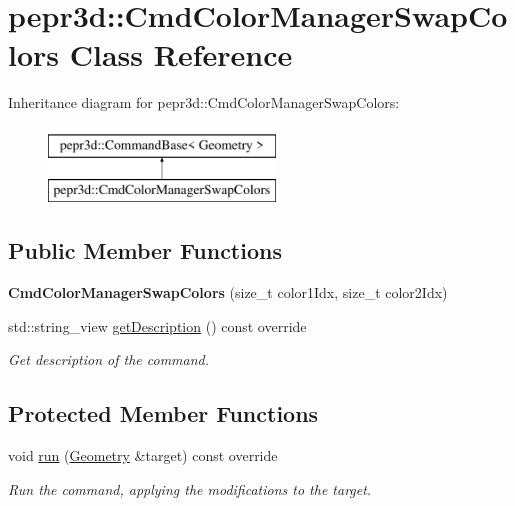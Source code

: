\hypertarget{classpepr3d_1_1_cmd_color_manager_swap_colors}{}\section{pepr3d\+::Cmd\+Color\+Manager\+Swap\+Colors Class Reference}
\label{classpepr3d_1_1_cmd_color_manager_swap_colors}
Inheritance diagram for pepr3d\+::Cmd\+Color\+Manager\+Swap\+Colors\+:\begin{figure}[H]
\begin{center}
\leavevmode
\includegraphics[height=2.000000cm]{classpepr3d_1_1_cmd_color_manager_swap_colors}
\end{center}
\end{figure}
\subsection*{Public Member Functions}
\begin{DoxyCompactItemize}
\item 
\mbox{\label{classpepr3d_1_1_cmd_color_manager_swap_colors_af6dc11ce3593fe744de4227aedc03239}} 
{\bfseries Cmd\+Color\+Manager\+Swap\+Colors} (size\+\_\+t color1\+Idx, size\+\_\+t color2\+Idx)
\item 
\mbox{\label{classpepr3d_1_1_cmd_color_manager_swap_colors_abec8b759af2a20f032491ec55a6e36a4}} 
std\+::string\+\_\+view \mbox{\hyperlink{classpepr3d_1_1_cmd_color_manager_swap_colors_abec8b759af2a20f032491ec55a6e36a4}{get\+Description}} () const override
\begin{DoxyCompactList}\small\item\em Get description of the command. \end{DoxyCompactList}\end{DoxyCompactItemize}
\subsection*{Protected Member Functions}
\begin{DoxyCompactItemize}
\item 
\mbox{\label{classpepr3d_1_1_cmd_color_manager_swap_colors_a8b2d71615f5391bfa047ab34ac81c08b}} 
void \mbox{\hyperlink{classpepr3d_1_1_cmd_color_manager_swap_colors_a8b2d71615f5391bfa047ab34ac81c08b}{run}} (\mbox{\hyperlink{classpepr3d_1_1_geometry}{Geometry}} \&target) const override
\begin{DoxyCompactList}\small\item\em Run the command, applying the modifications to the target. \end{DoxyCompactList}\end{DoxyCompactItemize}
